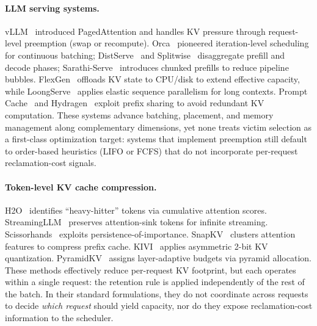 \documentclass[sigconf,nonacm]{acmart}
\begin{document}
\paragraph{LLM serving systems.}
vLLM~\cite{Kwon2023} introduced PagedAttention and handles KV pressure through
request-level preemption (swap or recompute).
Orca~\cite{Yu2022} pioneered iteration-level scheduling for continuous
batching; DistServe~\cite{Zhong2024} and Splitwise~\cite{Patel2024}
disaggregate prefill and decode phases;
Sarathi-Serve~\cite{Agrawal2024sarathiserve} introduces chunked prefills to
reduce pipeline bubbles.
FlexGen~\cite{Sheng2023flexgen} offloads KV state to CPU/disk to extend
effective capacity, while LoongServe~\cite{Wu2024loongserve} applies elastic
sequence parallelism for long contexts.
Prompt Cache~\cite{Gim2024} and Hydragen~\cite{Juravsky2024} exploit prefix
sharing to avoid redundant KV computation.
These systems advance batching, placement, and memory management along
complementary dimensions, yet none treats victim selection as a first-class
optimization target: systems that implement preemption still default to
order-based heuristics (LIFO or FCFS) that do not incorporate per-request
reclamation-cost signals.

\paragraph{Token-level KV cache compression.}
H2O~\cite{Zhang2023h2o} identifies ``heavy-hitter'' tokens via
cumulative attention scores.
Streaming\-LLM~\cite{Xiao2024} preserves attention-sink tokens
for infinite streaming.
Scissorhands~\cite{Liu2023scissorhands} exploits persistence-of-importance.
SnapKV~\cite{Li2024snapkv} clusters attention features to compress prefix
cache.
KIVI~\cite{Liu2024kivi} applies asymmetric 2-bit KV quantization.
PyramidKV~\cite{Zhang2025pyramidkv} assigns layer-adaptive budgets via pyramid
allocation.
These methods effectively reduce per-request KV footprint, but each operates
within a single request: the retention rule is applied independently of the
rest of the batch.  In their standard formulations, they do not coordinate
across requests to decide \emph{which request} should yield capacity, nor do
they expose reclamation-cost information to the scheduler.
\end{document}
